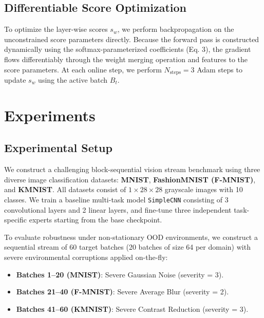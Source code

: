 \documentclass{article}
\theoremstyle{plain}
\theoremstyle{definition}
\theoremstyle{remark}
\begin{document}
\subsection{Differentiable Score Optimization}
To optimize the layer-wise scores $s_w$, we perform backpropagation on the unconstrained score parameters directly. Because the forward pass is constructed dynamically using the softmax-parameterized coefficients (Eq. 3), the gradient flows differentiably through the weight merging operation and features to the score parameters. At each online step, we perform $N_{\text{steps}} = 3$ Adam steps to update $s_w$ using the active batch $B_t$.

\section{Experiments}
\label{submission-experiments}

\subsection{Experimental Setup}
We construct a challenging block-sequential vision stream benchmark using three diverse image classification datasets: \textbf{MNIST}, \textbf{FashionMNIST (F-MNIST)}, and \textbf{KMNIST}. All datasets consist of $1\times28\times28$ grayscale images with 10 classes. We train a baseline multi-task model \texttt{SimpleCNN} consisting of 3 convolutional layers and 2 linear layers, and fine-tune three independent task-specific experts starting from the base checkpoint.

To evaluate robustness under non-stationary OOD environments, we construct a sequential stream of 60 target batches (20 batches of size 64 per domain) with severe environmental corruptions applied on-the-fly:
\begin{itemize}
    \item \textbf{Batches 1--20 (MNIST)}: Severe Gaussian Noise (severity = 3).
    \item \textbf{Batches 21--40 (F-MNIST)}: Severe Average Blur (severity = 2).
    \item \textbf{Batches 41--60 (KMNIST)}: Severe Contrast Reduction (severity = 3).
\end{itemize}
\end{document}
